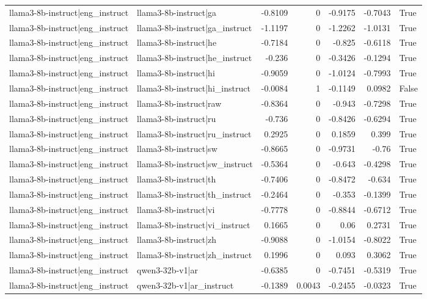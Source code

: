 \begin{table}
\begin{tabular}{l l r r r r l}
llama3-8b-instruct|eng_instruct & llama3-8b-instruct|ga & -0.8109 & 0 & -0.9175 & -0.7043 & True \\
llama3-8b-instruct|eng_instruct & llama3-8b-instruct|ga_instruct & -1.1197 & 0 & -1.2262 & -1.0131 & True \\
llama3-8b-instruct|eng_instruct & llama3-8b-instruct|he & -0.7184 & 0 & -0.825 & -0.6118 & True \\
llama3-8b-instruct|eng_instruct & llama3-8b-instruct|he_instruct & -0.236 & 0 & -0.3426 & -0.1294 & True \\
llama3-8b-instruct|eng_instruct & llama3-8b-instruct|hi & -0.9059 & 0 & -1.0124 & -0.7993 & True \\
llama3-8b-instruct|eng_instruct & llama3-8b-instruct|hi_instruct & -0.0084 & 1 & -0.1149 & 0.0982 & False \\
llama3-8b-instruct|eng_instruct & llama3-8b-instruct|raw & -0.8364 & 0 & -0.943 & -0.7298 & True \\
llama3-8b-instruct|eng_instruct & llama3-8b-instruct|ru & -0.736 & 0 & -0.8426 & -0.6294 & True \\
llama3-8b-instruct|eng_instruct & llama3-8b-instruct|ru_instruct & 0.2925 & 0 & 0.1859 & 0.399 & True \\
llama3-8b-instruct|eng_instruct & llama3-8b-instruct|sw & -0.8665 & 0 & -0.9731 & -0.76 & True \\
llama3-8b-instruct|eng_instruct & llama3-8b-instruct|sw_instruct & -0.5364 & 0 & -0.643 & -0.4298 & True \\
llama3-8b-instruct|eng_instruct & llama3-8b-instruct|th & -0.7406 & 0 & -0.8472 & -0.634 & True \\
llama3-8b-instruct|eng_instruct & llama3-8b-instruct|th_instruct & -0.2464 & 0 & -0.353 & -0.1399 & True \\
llama3-8b-instruct|eng_instruct & llama3-8b-instruct|vi & -0.7778 & 0 & -0.8844 & -0.6712 & True \\
llama3-8b-instruct|eng_instruct & llama3-8b-instruct|vi_instruct & 0.1665 & 0 & 0.06 & 0.2731 & True \\
llama3-8b-instruct|eng_instruct & llama3-8b-instruct|zh & -0.9088 & 0 & -1.0154 & -0.8022 & True \\
llama3-8b-instruct|eng_instruct & llama3-8b-instruct|zh_instruct & 0.1996 & 0 & 0.093 & 0.3062 & True \\
llama3-8b-instruct|eng_instruct & qwen3-32b-v1|ar & -0.6385 & 0 & -0.7451 & -0.5319 & True \\
llama3-8b-instruct|eng_instruct & qwen3-32b-v1|ar_instruct & -0.1389 & 0.0043 & -0.2455 & -0.0323 & True \\

\end{tabular}
\end{table}
